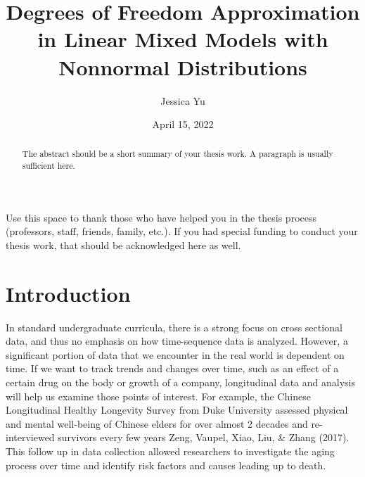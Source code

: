 \documentclass[12pt, twoside]{amherstthesis}
\title{Degrees of Freedom Approximation in Linear Mixed Models with Nonnormal Distributions}
\author{Jessica Yu}
\date{April 15, 2022}
\begin{document}
\doublespace
  \maketitle

\frontmatter %
\pagestyle{fancyplain}

  \begin{abstract}
    The abstract should be a short summary of your thesis work. A paragraph is usually sufficient here.
  \end{abstract}
  \begin{acknowledgments}
    Use this space to thank those who have helped you in the thesis process (professors, staff, friends, family, etc.). If you had special funding to conduct your thesis work, that should be acknowledged here as well.
  \end{acknowledgments}

  \hypersetup{linkcolor=black}
  \setcounter{tocdepth}{2}
  \tableofcontents

  \listoftables

  \listoffigures


\mainmatter %
\pagestyle{fancyplain} %

\hypertarget{intro}{%
\chapter{Introduction}\label{intro}}

In standard undergraduate curricula, there is a strong focus on cross sectional data, and thus no emphasis on how time-sequence data is analyzed. However, a significant portion of data that we encounter in the real world is dependent on time. If we want to track trends and changes over time, such as an effect of a certain drug on the body or growth of a company, longitudinal data and analysis will help us examine those points of interest. For example, the Chinese Longitudinal Healthy Longevity Survey from Duke University assessed physical and mental well-being of Chinese elders for over almost 2 decades and re-interviewed survivors every few years Zeng, Vaupel, Xiao, Liu, \& Zhang (2017). This follow up in data collection allowed researchers to investigate the aging process over time and identify risk factors and causes leading up to death.
\end{document}
